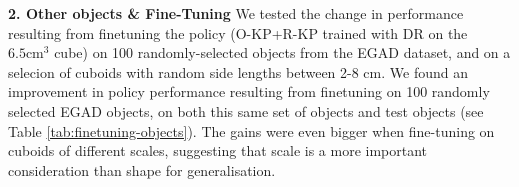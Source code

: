 \documentclass[letterpaper, 10 pt, conference]{ieeeconf}  %
\begin{document}

\noindent \textbf{2. Other objects \& Fine-Tuning} We tested the change in performance resulting from finetuning the policy (O-KP+R-KP trained with DR on the $6.5\text{cm}^3$ cube) on 100 randomly-selected objects from the EGAD dataset, and on a selecion of cuboids with random side lengths between 2-8 cm. We found an improvement in policy performance resulting from finetuning on 100 randomly selected EGAD objects, on both this same set of objects and test objects (see Table \ref{tab:finetuning-objects}). The gains were even bigger when fine-tuning on cuboids of different scales, suggesting that scale is a more important consideration than shape for generalisation.
\end{document}
